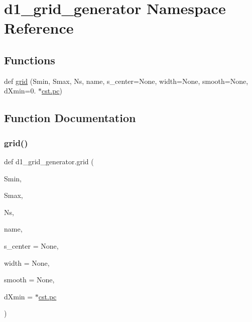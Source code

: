 \hypertarget{namespaced1__grid__generator}{}\section{d1\+\_\+grid\+\_\+generator Namespace Reference}
\label{namespaced1__grid__generator}
\subsection*{Functions}
\begin{DoxyCompactItemize}
\item 
def \hyperlink{namespaced1__grid__generator_aaec8f36a14bee301f935c0a594b2dc2a}{grid} (Smin, Smax, Ns, name, s\+\_\+center=None, width=None, smooth=None, d\+Xmin=0. $\ast$\hyperlink{constants_8h_a2884cd030c4c825754349a525a1d06ce}{cst.\+pc})
\end{DoxyCompactItemize}


\subsection{Function Documentation}
\mbox{\label{namespaced1__grid__generator_aaec8f36a14bee301f935c0a594b2dc2a}} 
\subsubsection{\texorpdfstring{grid()}{grid()}}
{\footnotesize\ttfamily def d1\+\_\+grid\+\_\+generator.\+grid (\begin{DoxyParamCaption}\item[{}]{Smin,  }\item[{}]{Smax,  }\item[{}]{Ns,  }\item[{}]{name,  }\item[{}]{s\+\_\+center = {\ttfamily None},  }\item[{}]{width = {\ttfamily None},  }\item[{}]{smooth = {\ttfamily None},  }\item[{}]{d\+Xmin = {$\ast$\hyperlink{constants_8h_a2884cd030c4c825754349a525a1d06ce}{cst.\+pc}} }\end{DoxyParamCaption})}


